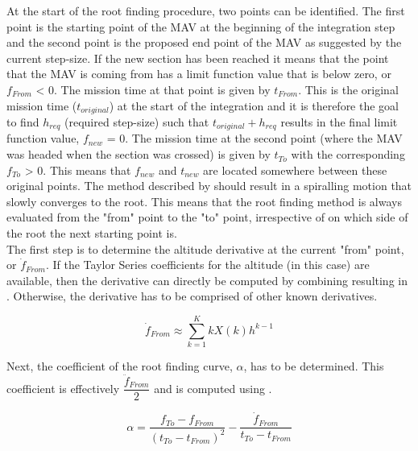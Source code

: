 \noindent
At the start of the root finding procedure, two points can be identified. The first point is the starting point of the \ac{MAV} at the beginning of the integration step and the second point is the proposed end point of the \ac{MAV} as suggested by the current step-size. If the new section has been reached it means that the point that the \ac{MAV} is coming from has a limit function value that is below zero, or $f_{From}$ < 0. The mission time at that point is given by $t_{From}$. This is the original mission time ($t_{original}$) at the start of the integration and it is therefore the goal to find $h_{req}$ (required step-size) such that $t_{original}+h_{req}$ results in the final limit function value, $f_{new}$ = 0. The mission time at the second point (where the \ac{MAV} was headed when the section was crossed) is given by $t_{To}$ with the corresponding $f_{To}$ > 0. This means that $f_{new}$ and $t_{new}$ are located somewhere between these original points. The method described by \cite{bergsma2015application} should result in a spiralling motion that slowly converges to the root. This means that the root finding method is always evaluated from the "from" point to the "to" point, irrespective of on which side of the root the next starting point is. \\

\noindent
The first step is to determine the altitude derivative at the current "from" point, or $\dot{f}_{From}$. If the Taylor Series coefficients for the altitude (in this case) are available, then the derivative can directly be computed by combining  resulting in . Otherwise, the derivative has to be comprised of other known derivatives.

\begin{equation}\label{eq:fFromDot}
\dot{f}_{From} \approx \displaystyle\sum_{k=1}^{K}kX\left(k\right) h^{k-1}
\end{equation}

\noindent
Next, the coefficient of the root finding curve, $\alpha$, has to be determined. This coefficient is effectively $\dfrac{\ddot{f}_{From}}{2}$ and is computed using .

\begin{equation} \label{eq:alphaForRoot}
\alpha = \dfrac{f_{To}-f_{From}}{\left(t_{To}-t_{From}\right)^{2}}-\dfrac{\dot{f}_{From}}{t_{To}-t_{From}}
\end{equation}


